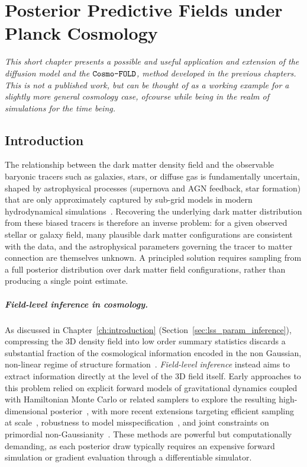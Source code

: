 

\chapter{Posterior Predictive Fields under Planck Cosmology}
\label{ch:field_pos}

\textit{This short chapter presents a possible and useful application and extension of the diffusion model and the $\texttt{Cosmo-FOLD}$, method developed in the previous chapters. This is not a published work, but can be thought of as a working example for a slightly more general cosmology case, ofcourse while being in the realm of simulations for the time being.}

\section{Introduction}
\label{sec:intro_posterior}

The relationship between the dark matter density field and the observable
baryonic tracers such as galaxies, stars, or diffuse gas is fundamentally
uncertain, shaped by astrophysical processes (supernova and AGN feedback,
star formation) that are only approximately captured by sub-grid models
in modern hydrodynamical simulations~\citep{villaescusa-navarro_camels_2022}.
Recovering the underlying dark matter distribution from these biased tracers
is therefore an inverse problem: for a given observed stellar or galaxy field, many plausible dark matter configurations are consistent with the data, and the astrophysical parameters governing the tracer to matter connection are themselves unknown. A principled solution requires sampling from a full posterior distribution over dark matter field configurations, rather than producing a single point estimate.

\paragraph{Field-level inference in cosmology.}
As discussed in Chapter~\ref{ch:introduction} (Section~\ref{sec:lss_param_inference}), compressing the 3D density field into low order summary statistics discards a substantial fraction of the cosmological information encoded in the non Gaussian, non-linear regime of structure formation~\citep{leclercq_accuracy_2021,jasche_bayesian_2013}.
 \emph{Field-level inference} instead aims to extract information directly at the level of the 3D field
itself. Early approaches to this problem relied on explicit forward models of gravitational dynamics coupled with Hamiltonian Monte Carlo or related samplers to explore the resulting high-dimensional posterior~\citep{jasche_bayesian_2013}, with more recent extensions targeting efficient sampling at scale~\citep{bayer_field-level_2023}, robustness to model misspecification~\citep{shao_robust_2022}, and joint constraints on primordial non-Gaussianity~\citep{andrews_bayesian_2023}. These methods are powerful but computationally demanding, as each posterior draw typically requires an expensive forward simulation or gradient evaluation through a differentiable simulator.



